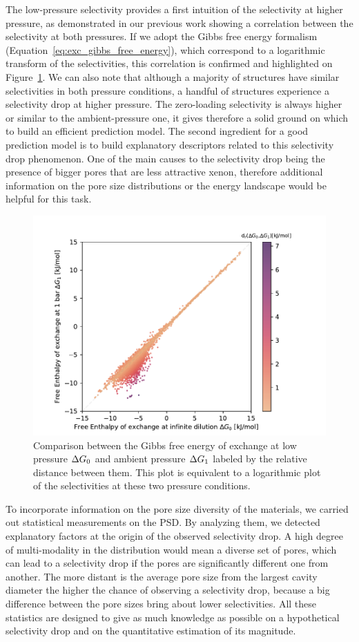 \documentclass[main]{subfiles}
\begin{document}
The low-pressure selectivity provides a first intuition of the selectivity at higher pressure, as demonstrated in our previous work showing a correlation between the selectivity at both pressures.\cite{Ren_2021} If we adopt the Gibbs free energy formalism (Equation~\ref{eq:exc_gibbs_free_energy}), which correspond to a logarithmic transform of the selectivities, this correlation is confirmed and highlighted on Figure~\ref{fgr:problem}. We can also note that although a majority of structures have similar selectivities in both pressure conditions, a handful of structures experience a selectivity drop at higher pressure. The zero-loading selectivity is always higher or similar to the ambient-pressure one, it gives therefore a solid ground on which to build an efficient prediction model. The second ingredient for a good prediction model is to build explanatory descriptors related to this selectivity drop phenomenon. One of the main causes to the selectivity drop being the presence of bigger pores that are less attractive xenon, therefore additional information on the pore size distributions or the energy landscape would be helpful for this task.

\begin{figure}[ht]
\centering
  \includegraphics[width=0.5\linewidth]{figures/4-ml/main/Scatterplot_G1_G0.pdf}
  \caption{Comparison between the Gibbs free energy of exchange at low pressure $\Delta G_{\text{0}}$ and ambient pressure $\Delta G_{\text{1}}$ labeled by the relative distance between them. This plot is equivalent to a logarithmic plot of the selectivities at these two pressure conditions.}
  \label{fgr:problem}
\end{figure}

To incorporate information on the pore size diversity of the materials, we carried out statistical measurements on the PSD. By analyzing them, we detected explanatory factors at the origin of the observed selectivity drop. A high degree of multi-modality in the distribution would mean a diverse set of pores, which can lead to a selectivity drop if the pores are significantly different one from another. The more distant is the average pore size from the largest cavity diameter the higher the chance of observing a selectivity drop, because a big difference between the pore sizes bring about lower selectivities. All these statistics are designed to give as much knowledge as possible on a hypothetical selectivity drop and on the quantitative estimation of its magnitude.
\end{document}

